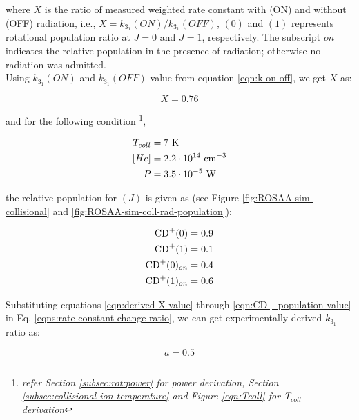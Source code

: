 where $X$ is the ratio of measured weighted rate constant with (ON) and without
(OFF) radiation, i.e., $X=k_{3_1}(ON) / k_{3_1}(OFF)$, \CD$(0)$ and \CD$(1)$
represents \CD rotational population ratio at $J=0$ and $J=1$, respectively.
The subscript $on$ indicates the relative population in the presence of
radiation; otherwise no radiation was admitted.\\

Using $k_{3_1}(ON)$ and $k_{3_1}(OFF)$ value from equation \ref{eqn:k-on-off},
we get $X$ as:

\begin{equation}
    X = 0.76
    \label{eqn:derived-X-value}
\end{equation}

and for the following condition \footnote{\textit{refer Section
        \ref{subsec:rot:power} for power derivation, Section
        \ref{subsec:collisional-ion-temperature} and Figure \ref{eqn:Tcoll} for
        T$_{coll}$ derivation}},

\begin{align*}
    T_{coll} & = 7\ \text{K}                      \\
    [He]     & = 2.2 \cdot 10^{14}\ \text{cm$^{-3}$} \\
    P        & = 3.5 \cdot 10^{-5}\ \text{W}
\end{align*}

the relative population for \CD$(J)$ is given as (see Figure
\ref{fig:ROSAA-sim-collisional} and \ref{fig:ROSAA-sim-coll-rad-population}):

\begin{align}
    \text{CD}^+(0)      & = 0.9                                  \\
    \text{CD}^+(1)      & = 0.1                                  \\
    \text{CD}^+(0)_{on} & = 0.4                                  \\
    \text{CD}^+(1)_{on} & = 0.6 \label{eqn:CD+-population-value}
\end{align}

Substituting equations \ref{eqn:derived-X-value} through
\ref{eqn:CD+-population-value} in Eq. \ref{eqns:rate-constant-change-ratio}, we
can get experimentally derived $k_{3_1}$ ratio as:

\begin{equation}
    a = 0.5
    \label{eqn:k31-ratio}
\end{equation}

